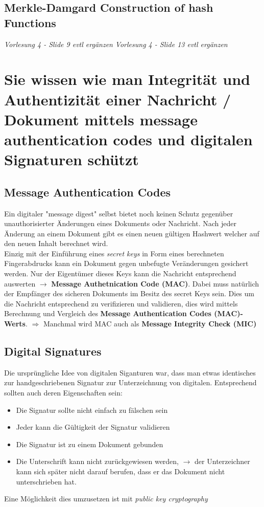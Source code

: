 \documentclass{report}
\theoremstyle{definition}
\theoremstyle{example}
\begin{document}
	\subsection{Merkle-Damgard Construction of hash Functions}
\textit{Vorlesung 4 - Slide 9 evtl ergänzen}
\textit{Vorlesung 4 - Slide 13 evtl ergänzen}


\section{Sie wissen wie man Integrität und Authentizität einer Nachricht / Dokument mittels message authentication codes und digitalen Signaturen schützt}


	\subsection{Message Authentication Codes}	
Ein digitaler "message digest" selbst bietet noch keinen Schutz gegenüber unauthorisierter Änderungen eines Dokuments oder Nachricht. Nach jeder Änderung an einem Dokument gibt es einen neuen gültigen Hashwert welcher auf den neuen Inhalt berechnet wird. \\
Einzig mit der Einführung eines \textit{secret keys} in Form eines berechneten Fingerabdrucks kann ein Dokument gegen unbefugte Veränderungen gesichert werden. Nur der Eigentümer dieses Keys kann die Nachricht entsprechend auswerten $\rightarrow$ \textbf{Message Authetnication Code (MAC)}. Dabei muss natürlich der Empfänger des sicheren Dokuments im Besitz des secret Keys sein. Dies um die Nachricht entsprechend zu verifizieren und validieren, dies wird mittels Berechnung und Vergleich des \textbf{Message Authentication Codes (MAC)-Werts}. $\Rightarrow$ Manchmal wird MAC auch als \textbf{Message Integrity Check (MIC)}

	\subsection{Digital Signatures}
Die ursprüngliche Idee von digitalen Siganturen war, dass man etwas identisches zur handgeschriebenen Signatur zur Unterzeichnung von digitalen. Entsprechend sollten auch deren Eigenschaften sein:\\

\begin{itemize}
	\item Die Signatur sollte nicht einfach zu fälschen sein
	\item Jeder kann die Gültigkeit der Signatur validieren
	\item Die Signatur ist zu einem Dokument gebunden
	\item Die Unterschrift kann nicht zurückgewiesen werden, $\rightarrow$ der Unterzeichner kann sich später nicht darauf berufen, dass er das Dokument nicht unterschrieben hat.
\end{itemize}	
Eine Möglichkeit dies umzusetzen ist mit \textit{public key cryptography}
\end{document}
